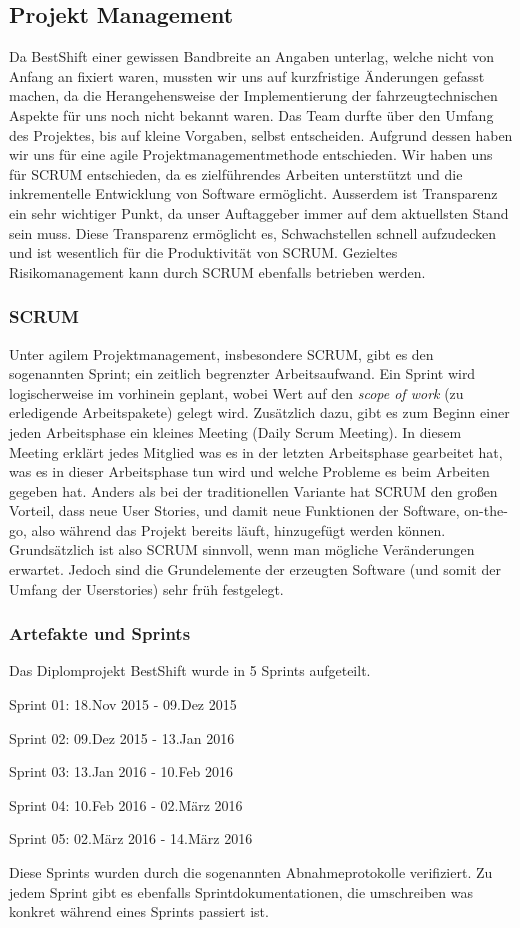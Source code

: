 \subsection{Projekt Management}

Da BestShift einer gewissen Bandbreite an Angaben unterlag, welche nicht von Anfang an fixiert waren,
mussten wir uns auf kurzfristige Änderungen gefasst machen, da die Herangehensweise der Implementierung der fahrzeugtechnischen Aspekte für uns noch nicht bekannt waren.
Das Team durfte über den Umfang des Projektes, bis auf kleine Vorgaben, selbst entscheiden.
Aufgrund dessen haben wir uns für eine agile Projektmanagementmethode entschieden. 
Wir haben uns für SCRUM entschieden, da es zielführendes Arbeiten unterstützt und die inkrementelle Entwicklung von Software ermöglicht. 
Ausserdem ist Transparenz ein sehr wichtiger Punkt, da unser Auftaggeber immer auf dem aktuellsten Stand sein muss. Diese Transparenz ermöglicht es, Schwachstellen schnell aufzudecken und ist wesentlich für die Produktivität von SCRUM.
Gezieltes Risikomanagement kann durch SCRUM ebenfalls betrieben werden. 

\subsubsection{SCRUM}
Unter agilem Projektmanagement, insbesondere SCRUM, gibt es den sogenannten
Sprint; ein zeitlich begrenzter Arbeitsaufwand. Ein Sprint wird logischerweise im vorhinein geplant, wobei Wert auf den \textit{scope of work} (zu erledigende Arbeitspakete) gelegt wird. 
Zusätzlich dazu, gibt es zum Beginn einer jeden
Arbeitsphase ein kleines Meeting (Daily Scrum Meeting). In diesem Meeting erklärt jedes Mitglied was es in der letzten Arbeitsphase gearbeitet hat, was es in dieser Arbeitsphase tun wird und welche Probleme es beim Arbeiten gegeben hat.
Anders als bei der traditionellen Variante hat SCRUM den großen Vorteil, dass neue User Stories, und damit neue Funktionen der Software, on-the-go, also während das Projekt bereits läuft, hinzugefügt werden können. 
Grundsätzlich ist also SCRUM sinnvoll, wenn man mögliche Veränderungen erwartet. Jedoch sind die Grundelemente der erzeugten Software (und somit der Umfang der Userstories) sehr früh festgelegt.

\subsubsection{Artefakte und Sprints}
Das Diplomprojekt BestShift wurde in 5 Sprints aufgeteilt.
\begin{description}
\item Sprint 01: 18.Nov 2015 - 09.Dez 2015
\item Sprint 02: 09.Dez 2015 - 13.Jan 2016
\item Sprint 03: 13.Jan 2016 - 10.Feb 2016
\item Sprint 04: 10.Feb 2016 - 02.März 2016
\item Sprint 05: 02.März 2016 - 14.März 2016
\end{description}

Diese Sprints wurden durch die sogenannten Abnahmeprotokolle verifiziert.
Zu jedem Sprint gibt es ebenfalls Sprintdokumentationen, die umschreiben was konkret während eines Sprints passiert ist.


\clearpage %